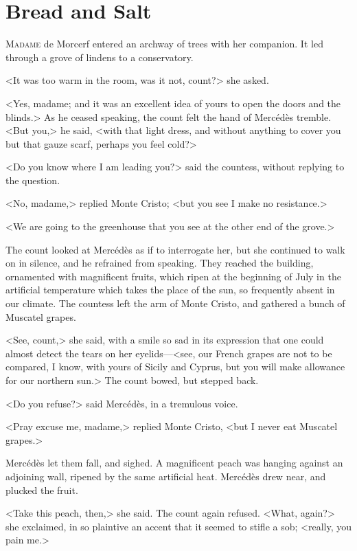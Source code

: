 \chapter{Bread and Salt} 

 \lettrine{M}{adame} de Morcerf entered an archway of trees with her companion. It led through a grove of lindens to a conservatory. 

 <It was too warm in the room, was it not, count?> she asked. 

 <Yes, madame; and it was an excellent idea of yours to open the doors and the blinds.> As he ceased speaking, the count felt the hand of Mercédès tremble. <But you,> he said, <with that light dress, and without anything to cover you but that gauze scarf, perhaps you feel cold?> 

 <Do you know where I am leading you?> said the countess, without replying to the question. 

 <No, madame,> replied Monte Cristo; <but you see I make no resistance.> 

 <We are going to the greenhouse that you see at the other end of the grove.> 

 The count looked at Mercédès as if to interrogate her, but she continued to walk on in silence, and he refrained from speaking. They reached the building, ornamented with magnificent fruits, which ripen at the beginning of July in the artificial temperature which takes the place of the sun, so frequently absent in our climate. The countess left the arm of Monte Cristo, and gathered a bunch of Muscatel grapes. 

 <See, count,> she said, with a smile so sad in its expression that one could almost detect the tears on her eyelids—<see, our French grapes are not to be compared, I know, with yours of Sicily and Cyprus, but you will make allowance for our northern sun.> The count bowed, but stepped back. 

 <Do you refuse?> said Mercédès, in a tremulous voice. 

 <Pray excuse me, madame,> replied Monte Cristo, <but I never eat Muscatel grapes.> 

 Mercédès let them fall, and sighed. A magnificent peach was hanging against an adjoining wall, ripened by the same artificial heat. Mercédès drew near, and plucked the fruit. 

 <Take this peach, then,> she said. The count again refused. <What, again?> she exclaimed, in so plaintive an accent that it seemed to stifle a sob; <really, you pain me.> 

